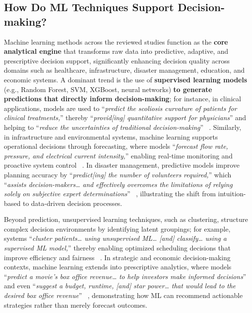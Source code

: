 \documentclass{sfuthesis}
\begin{document}
\subsection{How Do ML Techniques Support Decision-making?}
Machine learning methods across the reviewed studies function as the \textbf{core analytical engine} that transforms raw data into predictive, adaptive, and prescriptive decision support, significantly enhancing decision quality across domains such as healthcare, infrastructure, disaster management, education, and economic systems. A dominant trend is the use of\textbf{ supervised learning models} (e.g., Random Forest, SVM, XGBoost, neural networks) \textbf{to generate predictions that directly inform decision-making}; for instance, in clinical applications, models are used to “\textit{predict the scoliosis curvature of patients for clinical treatments,}” thereby “\textit{provid[ing] quantitative support for physicians}” and helping to “\textit{reduce the uncertainties of traditional decision-making}” ~\cite{Deng2017ScoliosisDSS}. Similarly, in infrastructure and environmental systems, machine learning supports operational decisions through forecasting, where models “\textit{forecast flow rate, pressure, and electrical current intensity,}” enabling real-time monitoring and proactive system control ~\cite{ataei2024intelligent}. In disaster management, predictive models improve planning accuracy by “\textit{predict[ing] the number of volunteers required,}” which “\textit{assists decision-makers… and effectively overcomes the limitations of relying solely on subjective expert determinations}” ~\cite{Chen2023TyphoonVolunteers}, illustrating the shift from intuition-based to data-driven decision processes.\par
Beyond prediction, unsupervised learning techniques, such as clustering, structure complex decision environments by identifying latent groupings; for example, systems “\textit{cluster patients… using unsupervised ML… [and] classify… using a supervised ML model,}” thereby enabling optimized scheduling decisions that improve efficiency and fairness ~\cite{feng2024adaptive}. In strategic and economic decision-making contexts, machine learning extends into prescriptive analytics, where models “\textit{predict a movie’s box office revenue… to help investors make informed decisions}” and even “\textit{suggest a budget, runtime, [and] star power… that would lead to the desired box office revenue}” ~\cite{leem2023towards}, demonstrating how ML can recommend actionable strategies rather than merely forecast outcomes.\par
\end{document}
